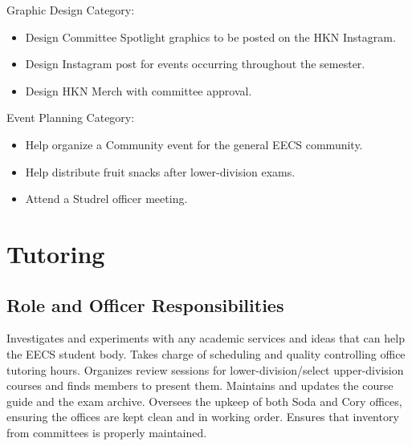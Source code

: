 \documentclass[11pt, article, oneside]{memoir}
\begin{document}
        Graphic Design Category:
        \begin{itemize}
            \item Design Committee Spotlight graphics to be posted on the HKN Instagram.
            \item Design Instagram post for events occurring throughout the semester.
            \item Design HKN Merch with committee approval.
        \end{itemize}

        Event Planning Category:
        \begin{itemize}
            \item Help organize a Community event for the general EECS community.
            \item Help distribute fruit snacks after lower-division exams.
            \item Attend a Studrel officer meeting.
        \end{itemize}

    \section{Tutoring}
    \subsection{Role and Officer Responsibilities}
    Investigates and experiments with any academic services and ideas that can help the EECS student body.
    Takes charge of scheduling and quality controlling office tutoring hours.
    Organizes review sessions for lower-division/select upper-division courses and finds members to present them.
    Maintains and updates the course guide and the exam archive.
    Oversees the upkeep of both Soda and Cory offices, ensuring the offices are kept clean and in working order.
    Ensures that inventory from committees is properly maintained.
\end{document}
